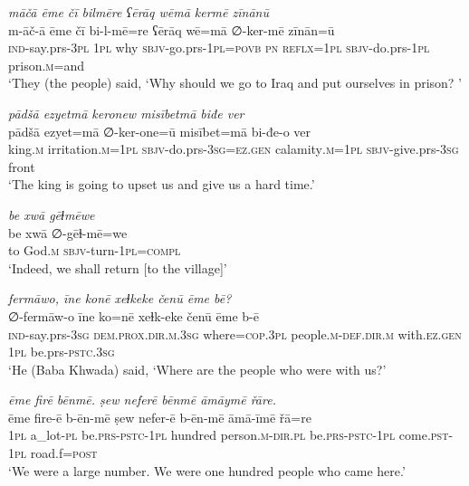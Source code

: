 \ea \label{BP.101}
\textit{māčā ēme čī bilmēre ʕērāq wēmā kermē zīnānū} \\ 
\gll m-āč-ā ēme čī bi-l-mē=re ʕērāq wē=mā ∅-ker-mē zīnān=ū \\ 
 \textsc{ind-}say.prs\textsc{-3pl} \textsc{1pl} why \textsc{sbjv-}go.prs\textsc{-\textsc{1pl}}\textsc{=\textsc{povb}} \textsc{pn} \textsc{reflx}\textsc{=\textsc{1pl}} \textsc{sbjv-}do.prs\textsc{-\textsc{1pl}} prison\textsc{.m}=and \\ 
\glt `They (the people) said, ‘Why should we go to Iraq and put ourselves in   prison? '
\z 
 
\ea \label{BP.102}
\textit{pādšā ezyetmā keronew misībetmā biđe ver} \\ 
\gll pādšā ezyet=mā ∅-ker-one=ū misībet=mā bi-đe-o ver \\ 
 king\textsc{.m} irritation\textsc{.m}\textsc{=\textsc{1pl}} \textsc{sbjv-}do.prs\textsc{-3sg}\textsc{=ez.gen} calamity\textsc{.m}\textsc{=\textsc{1pl}} \textsc{sbjv-}give.prs\textsc{-3sg} front \\ 
\glt `The king is going to upset us and give us a hard time.'
\z 
 
\ea \label{BP.103}
\textit{be xwā gēɫmēwe} \\ 
\gll be xwā ∅-gēɫ-mē=we \\ 
 to God\textsc{.m} \textsc{sbjv-}turn\textsc{-\textsc{1pl}}\textsc{=compl} \\ 
\glt `Indeed, we shall return [to the village]'
\z 
 
\ea \label{BP.109}
\textit{fermāwo, īne konē xeɫkeke čenū ēme bē?} \\ 
\gll ∅-fermāw-o īne ko=nē xeɫk-eke čenū ēme b-ē \\ 
 \textsc{ind-}say.prs\textsc{-3sg} \textsc{dem.prox}\textsc{.dir}\textsc{.m}\textsc{.3sg} where\textsc{=cop}\textsc{.3pl} people\textsc{.m}\textsc{-def}\textsc{.dir}\textsc{.m} with\textsc{.ez.gen} \textsc{1pl} be.prs\textsc{-pstc}\textsc{.3sg} \\ 
\glt `He (Baba Khwada) said, ‘Where are the people who were with us?'
\z 
 
\ea \label{BP.110}
\textit{ēme firē bēnmē. ṣew neferē bēnmē āmāymē řāre.} \\ 
\gll ēme fire-ē b-ēn-mē ṣew nefer-ē b-ēn-mē āmā-īmē řā=re \\ 
 \textsc{1pl} a\_lot\textsc{-pl} be.\textsc{prs}\textsc{-pstc}\textsc{-\textsc{1pl}} hundred person\textsc{.m}\textsc{-dir.pl} be.\textsc{prs}\textsc{-pstc}\textsc{-\textsc{1pl}} come\textsc{.pst}-\textsc{1pl} road.f\textsc{=\textsc{post}} \\ 
\glt `We were a large number. We were one hundred  people who came here.'
\z 
 
